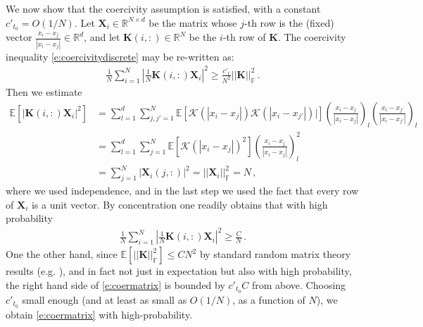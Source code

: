 We now show that the coercivity assumption is satisfied, with a constant $c'_{t_0}=O(1/N)$. Let $\mathbf{X}_i\in\mathbb{R}^{N\times d}$ be the matrix whose $j$-th row is the (fixed) vector $\frac{x_i-x_j}{|x_i-x_j|}\in\mathbb{R}^d$, and let $\mathbf{K}(i,:)\in\mathbb{R}^N$ be the $i$-th row of $\mathbf{K}$. The coercivity inequality \eqref{e:coercivitydiscrete} may be re-written as:
\begin{align}
\frac 1N\sum_{i=1}^N\left|\frac1N\mathbf{K}(i,:)\mathbf{X}_i\right|^2\ge\frac{c'_t}{N^2}||\mathbf{K}||^2_{\mathbb{F}}\,.
\label{e:coermatrix}
\end{align}
Then we estimate
\begin{align*}
\mathbb{E}\left[|\mathbf{K}(i,:)\mathbf{X}_i|^2\right]
&=\sum_{l=1}^d\sum_{j,j'=1}^N\mathbb{E}\left[\mathcal{K}(|x_i-x_j|)\mathcal{K}(|x_i-x_{j'}|)|\right] \left(\frac{x_i-x_j}{|x_i-x_j|}\right)_l \left(\frac{x_i-x_{j'}}{|x_i-x_{j'}|}\right)_l\\
&=\sum_{l=1}^d\sum_{j=1}^N \mathbb{E}\left[\mathcal{K}(|x_i-x_j|)^2\right] \left(\frac{x_i-x_j}{|x_i-x_j|}\right)^2_l \\
&= \sum_{j=1}^N |\mathbf{X}_i(j,:)|^2 = || \mathbf{X}_i||^2_{\mathbb{F}}=N\,,
\end{align*}
where we used independence, %
and in the last step we used the fact that every row of $\mathbf{X}_i$ is a unit vector. By concentration one readily obtains that with high probability
\begin{align*}
\frac 1N\sum_{i=1}^N\left|\frac1N\mathbf{K}(i,:)\mathbf{X}_i\right|^2\ge\frac CN\,.
\end{align*}
One the other hand, since $\mathbb{E}[||\mathbf{K}||^2_{\mathbb{F}}]\le CN^2$ by standard random matrix theory results (e.g. \cite{Vershynin:NARMT}), and in fact not just in expectation but also with high probability, the right hand side of \eqref{e:coermatrix} is bounded by $c'_{t_0}C$ from above. Choosing $c'_{t_0}$ small enough (and at least as small as $O(1/N)$, as a function of $N$), we obtain \eqref{e:coermatrix} with high-probability.


